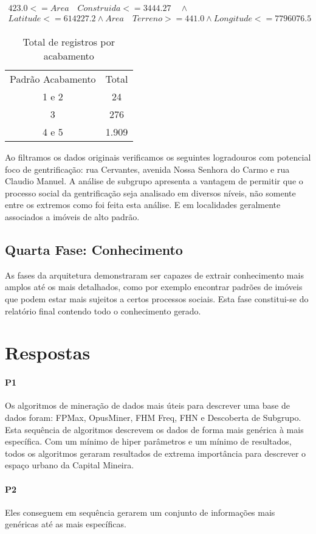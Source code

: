 \documentclass[12pt]{article}
\begin{document}
\begin{gather*}
423.0 <= Area \quad Construida <= 3444.27  \quad \land \\ Latitude <= 614227.2 \land Area \quad Terreno >= 441.0  \land Longitude <= 7796076.5
\end{gather*}
\begin{table}[ht]
\centering
\label{table:sub-aca}
\begin{tabular}{cc}
 Padrão Acabamento & Total  \\
 1 e 2 & 24 \\
 3 & 276 \\
 4 e 5 & 1.909 \\
\end{tabular}
\caption{Total de registros por acabamento}
\end{table}
Ao filtramos os dados originais verificamos os seguintes logradouros com potencial foco de gentrificação: rua Cervantes, avenida Nossa Senhora do Carmo e rua Claudio Manuel. A análise de subgrupo apresenta a vantagem de permitir que o processo social da gentrificação seja analisado em diversos níveis, não somente entre os extremos como foi feita esta análise. E em localidades geralmente associados a imóveis de alto padrão.

\subsection{Quarta Fase: Conhecimento}
As fases da arquitetura demonstraram ser capazes de extrair conhecimento mais amplos até os mais detalhados, como por exemplo encontrar padrões de imóveis que podem estar mais sujeitos a certos processos sociais. Esta fase constitui-se do relatório final contendo todo o conhecimento gerado.

\section{Respostas}
\paragraph{P1} Os algoritmos de mineração de dados mais úteis para descrever uma base de dados foram: FPMax, OpusMiner, FHM Freq, FHN e Descoberta de Subgrupo. Esta sequência de algoritmos descrevem os dados de forma mais genérica à mais específica. Com um mínimo de hiper parâmetros e um mínimo de resultados, todos os algoritmos geraram resultados de extrema importância para descrever o espaço urbano da Capital Mineira.
\paragraph{P2} Eles conseguem em sequência gerarem um conjunto de informações mais genéricas até as mais específicas.
\end{document}
